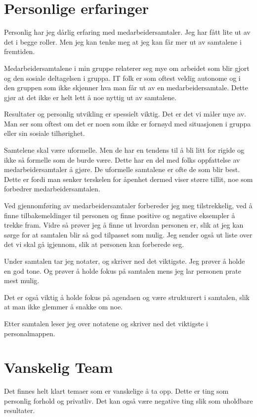 \documentclass[12pt, a4paper]{article}
\begin{document}
\section{Personlige erfaringer}
Personlig har jeg dårlig erfaring med medarbeidersamtaler. Jeg har fått lite ut
av det i begge roller. Men jeg kan tenke meg at jeg kan får mer ut av samtalene
i fremtiden. 

Medarbeidersamtalene i min gruppe relaterer seg mye om arbeidet som blir gjort
og den sosiale deltagelsen i gruppa. IT folk er som oftest veldig autonome og i
den gruppen som ikke skjønner hva man får ut av en medarbeidersamtale. Dette
gjør at det ikke er helt lett å noe nyttig ut av samtalene. 

Resultater og personlig utvikling er spessielt viktig. Det er det vi måler mye
av. Man ser som oftest om det er noen som ikke er fornøyd med situasjonen i
gruppa eller sin sosiale tilhørighet.  

Samtelene skal være uformelle. Men de har en tendens til å bli litt for rigide
og ikke så formelle som de burde være. Dette har en del med folks oppfattelse
av medarbeidersamtaler å gjøre. De uformelle samtalene er ofte de som blir
best. Dette er fordi man senker terskelen for åpenhet dermed viser større
tillit, noe som forbedrer medarbeidersamtalen.  

Ved gjennomføring av medarbeidersamtaler forbereder jeg meg tilstrekkelig, ved
å finne tilbakemeldinger til personen og finne positive og negative eksempler å
trekke fram. Vidre så prøver jeg å finne ut hvordan personen er, slik at jeg
kan sørge for at samtalen blir så god tilpasset som mulig.  
Jeg sender også ut liste over det vi skal gå igjennom, slik at personen kan
forberede seg.

Under samtalen tar jeg notater, og skriver ned det viktigste. Jeg prøver å
holde en god tone. Og prøver å holde fokus på samtalen mens jeg lar personen
prate mest mulig.  

Det er også viktig å holde fokus på agendaen og være strukturert i samtalen,
slik at man ikke glemmer å snakke om noe. 

Etter samtalen leser jeg over notatene og skriver ned det viktigste i
personalmappen. 

\section{Vanskelig Team}
Det finnes helt klart temaer som er vanskelige å ta opp. Dette er ting som
personlig forhold og privatliv. Det kan også være negative ting slik som
uholdbare resultater. 
\end{document}
